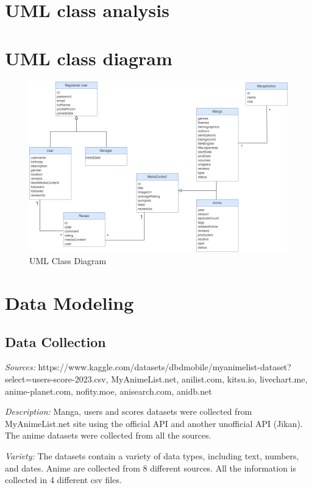 \section{UML class analysis}

\section{UML class diagram}
\begin{figure}[h]
    \centering
    \includegraphics[width=\linewidth]{Media/Class_Diagram.png}
    \caption{UML Class Diagram}
    \label{uml class diagram}
\end{figure}

\newpage


\section{Data Modeling}
\subsection{Data Collection}
\textit{Sources:} https://www.kaggle.com/datasets/dbdmobile/myanimelist-dataset?select=users-score-2023.csv, MyAnimeList.net,	anilist.com,  kitsu.io,			  livechart.me,
anime-planet.com,		nofity.moe,	   anisearch.com,		  anidb.net 	

\textit{Description:} Manga, users and scores datasets were collected from MyAnimeList.net site using the official API and another unofficial API (Jikan). The anime datasets were collected from all the sources. 

\textit{Variety:} The datasets contain a variety of data types, including text, numbers, and dates. Anime are collected from 8 different sources. All the information is collected in 4 different csv files.

